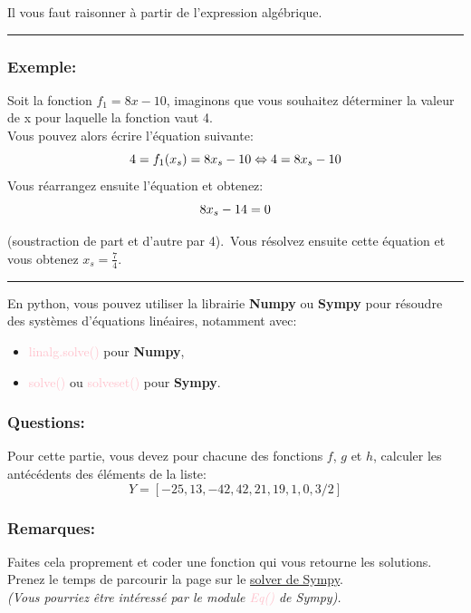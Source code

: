 \documentclass[11pt, french]{article}
\newcommand{\inlsnippet}[1]{\colorbox{gray!10}{\mbox{\textcolor{pink}{#1}}}}
\begin{document}
Il vous faut raisonner à partir de l'expression algébrique.

\noindent\rule{\textwidth}{1pt}
\subsubsection*{Exemple:}
Soit la fonction $f_1 = 8x-10$, imaginons que vous souhaitez déterminer la valeur de x pour laquelle la fonction vaut 4.\\
Vous pouvez alors écrire l'équation suivante:
\begin{equation}\nonumber
4 = f_1(x_s)  = 8x_s-10 \\
\Leftrightarrow 4 = 8x_s - 10 \\
\end{equation}
Vous réarrangez ensuite l'équation et obtenez:
\begin{equation}\nonumber
8x_s - 14 = 0 \\
\end{equation}

(soustraction de part et d'autre par 4).\
Vous résolvez ensuite cette équation et vous obtenez $x_s = \frac{7}{4}$.

\noindent\rule{\textwidth}{1pt}

En python, vous pouvez utiliser la librairie \textbf{Numpy} ou \textbf{Sympy} pour résoudre des systèmes d'équations linéaires, notamment avec:
\begin{itemize}
    \item \inlsnippet{linalg.solve()} pour \textbf{Numpy},
    \item \inlsnippet{solve()} ou \inlsnippet{solveset()} pour \textbf{Sympy}.
\end{itemize}


\subsubsection*{Questions:}
Pour cette partie, vous devez pour chacune des fonctions $f$, $g$ et $h$, calculer les antécédents des éléments de la liste:
$$
Y = [-25, 13, -42, 42, 21, 19, 1, 0, 3/2]
$$


\subsubsection*{Remarques:}
Faites cela proprement et coder une fonction qui vous retourne les solutions.\\
Prenez le temps de parcourir la page  sur le \href{https://docs.sympy.org/latest/modules/solvers/solvers.html#algebraic-equations}{solver de Sympy}.\\
\textit{(Vous pourriez être intéressé par le module \inlsnippet{Eq()} de Sympy).}
\end{document}
